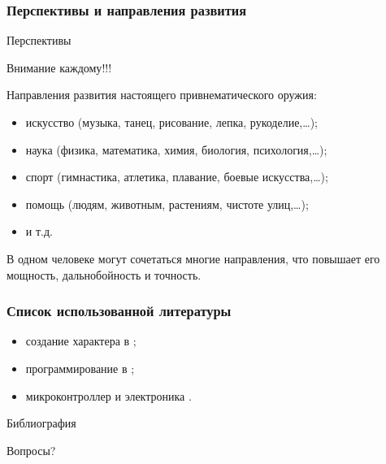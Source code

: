 \begin{frame}
    \frametitle{Перспективы и направления развития}
    
    \begin{block}{Перспективы}
        \begin{center}
            Внимание \alert{каждому}!!!
        \end{center}
    \end{block}
    
    Направления развития \alert{настоящего} привнематического оружия: 
    \begin{itemize}
        \item искусство (музыка, танец, рисование, лепка, рукоделие,\ldots);
        \item наука (физика, математика, химия, биология, психология,\ldots);
        \item спорт (гимнастика, атлетика, плавание, боевые искусства,\ldots);
        \item помощь (людям, животным, растениям, чистоте улиц,\ldots);
        \item и т.д.
    \end{itemize}
    
    \begin{block}{}
        \begin{center}
            В \alert{одном} человеке могут сочетаться \alert{многие} направления, что повышает его \alert{мощность}, \alert{дальнобойность} и \alert{точность}.
        \end{center}
    \end{block}
    
\end{frame}


\appendix

\begin{frame}
    \frametitle{Список использованной литературы}

    \begin{itemize}
        \item создание характера в \cite{bib:kovey:sevenHabits,bib:kovey:eightHabits};
        \item программирование в  \cite{bib:kernigan:practice};
        \item микроконтроллер и электроника \cite{bib:margolis:Arduino}.
    \end{itemize}
\end{frame}

\begin{frame}[allowframebreaks]{Библиография}
    
    
\end{frame}

\begin{frame}
    \begin{center}
    \end{center}
    
    \par\bigskip
    
    \begin{center}
        Вопросы?
    \end{center}
    
\end{frame}

